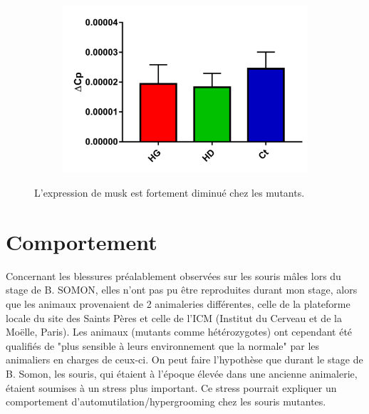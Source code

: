 \begin{figure}[h]
\begin{center}
\begin{subfigure}[h]{0.329\textwidth}
				\includegraphics[width=\textwidth]{./Images/qPCR/Comp_Struct_Mut.jpg}
			\end{subfigure}
		\end{center}
		\caption{L'expression de \gls{musk} est fortement diminué chez les mutants.}
		\label{fig:ExpressionMuSK}
	\end{figure}
\FloatBarrier

\section{Comportement}
\label{sec:Comportement}
Concernant les blessures préalablement observées sur les souris \mcrd mâles lors du stage de B. SOMON, elles n'ont pas pu être reproduites durant mon stage, alors que les animaux provenaient de 2 animaleries différentes, celle de la plateforme locale du site des Saints Pères et celle de l’ICM (Institut du Cerveau et de la Moëlle, Paris). Les animaux (mutants comme hétérozygotes) ont cependant été qualifiés de "plus sensible à leurs environnement que la normale" par les animaliers en charges de ceux-ci. On peut faire l'hypothèse que durant le stage de B. Somon, les souris, qui étaient à l'époque élevée dans une ancienne animalerie, étaient soumises à un stress plus important. Ce stress pourrait expliquer un comportement d'automutilation/hypergrooming chez les souris mutantes. 
